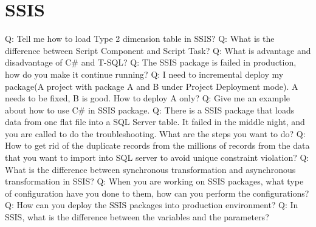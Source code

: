 \documentclass[a4paper,11pt]{article}
\begin{document}
\section{SSIS}
Q: Tell me how to load Type 2 dimension table in SSIS? \newline \newline
\noindent 
Q: What is the difference between Script Component and Script Task? \newline \newline
\noindent 
Q: What is advantage and disadvantage of C\# and T-SQL? \newline \newline
\noindent 
Q: The SSIS package is failed in production, how do you make it continue running? \newline \newline
\noindent 
Q: I need to incremental deploy my package(A project with package A and B under Project Deployment mode). A needs to be fixed, B is good. How to deploy A only? \newline \newline
\noindent 
Q: Give me an example about how to use C\# in SSIS package. \newline \newline
\noindent 
Q: There is a SSIS package that loads data from one flat file into a SQL Server table. It failed in the middle night, and you are called to do the troubleshooting. What are the steps you want to do? \newline \newline
\noindent 
Q: How to get rid of the duplicate records from the millions of records from the data that you want to import into SQL server to avoid unique constraint violation? \newline \newline
\noindent 
Q: What is the difference between synchronous transformation and asynchronous transformation in SSIS? \newline \newline
\noindent 
Q: When you are working on SSIS packages, what type of configuration have you done to them, how can you perform the configurations? \newline \newline
\noindent 
Q: How can you deploy the SSIS packages into production environment? \newline \newline
\noindent 
Q: In SSIS, what is the difference between the variables and the parameters? \newline \newline
\end{document}
